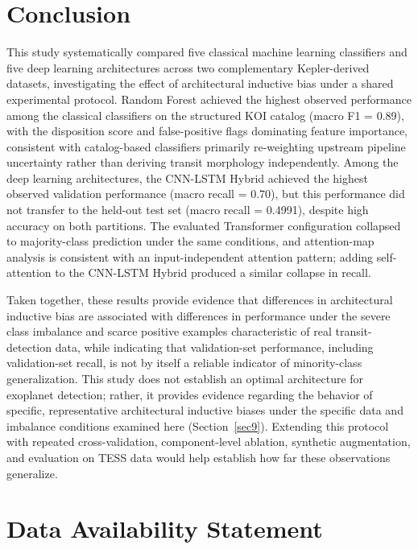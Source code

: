 \documentclass[preprint,11pt,times]{elsarticle}
\begin{document}
\section{Conclusion}\label{sec10}

This study systematically compared five classical machine learning classifiers and five deep learning architectures across two complementary Kepler-derived datasets, investigating the effect of architectural inductive bias under a shared experimental protocol. Random Forest achieved the highest observed performance among the classical classifiers on the structured KOI catalog (macro F1 = 0.89), with the disposition score and false-positive flags dominating feature importance, consistent with catalog-based classifiers primarily re-weighting upstream pipeline uncertainty rather than deriving transit morphology independently. Among the deep learning architectures, the CNN-LSTM Hybrid achieved the highest observed validation performance (macro recall = 0.70), but this performance did not transfer to the held-out test set (macro recall = 0.4991), despite high accuracy on both partitions. The evaluated Transformer configuration collapsed to majority-class prediction under the same conditions, and attention-map analysis is consistent with an input-independent attention pattern; adding self-attention to the CNN-LSTM Hybrid produced a similar collapse in recall.

Taken together, these results provide evidence that differences in architectural inductive bias are associated with differences in performance under the severe class imbalance and scarce positive examples characteristic of real transit-detection data, while indicating that validation-set performance, including validation-set recall, is not by itself a reliable indicator of minority-class generalization. This study does not establish an optimal architecture for exoplanet detection; rather, it provides evidence regarding the behavior of specific, representative architectural inductive biases under the specific data and imbalance conditions examined here (Section~\ref{sec9}). Extending this protocol with repeated cross-validation, component-level ablation, synthetic augmentation, and evaluation on TESS data would help establish how far these observations generalize.

\section*{Data Availability Statement}
\end{document}

